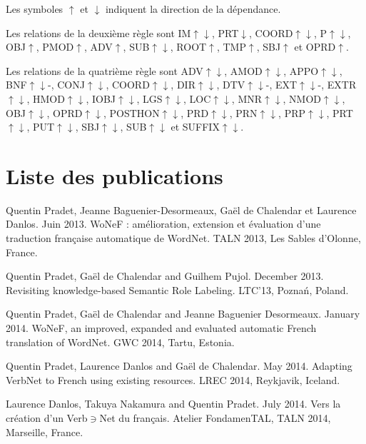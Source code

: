 \documentclass[oneside,parskip,draft]{scrbook}
\begin{document}
Les symboles $\uparrow$ et $\downarrow$ indiquent la direction de la
dépendance.

Les relations de la deuxième règle sont IM$\uparrow\downarrow$,
PRT$\downarrow$, COORD$\uparrow\downarrow$, P$\uparrow\downarrow$,
OBJ$\uparrow$, PMOD$\uparrow$, ADV$\uparrow$, SUB$\uparrow\downarrow$,
ROOT$\uparrow$, TMP$\uparrow$, SBJ$\uparrow$ et OPRD$\uparrow$.

Les relations de la quatrième règle sont ADV$\uparrow\downarrow$,
AMOD$\uparrow\downarrow$, APPO$\uparrow\downarrow$, BNF$\uparrow\downarrow$-,
CONJ$\uparrow\downarrow$, COORD$\uparrow\downarrow$, DIR$\uparrow\downarrow$,
DTV$\uparrow\downarrow$-, EXT$\uparrow\downarrow$-, EXTR$\uparrow\downarrow$,
HMOD$\uparrow\downarrow$, IOBJ$\uparrow\downarrow$, LGS$\uparrow\downarrow$,
LOC$\uparrow\downarrow$, MNR$\uparrow\downarrow$, NMOD$\uparrow\downarrow$,
OBJ$\uparrow\downarrow$, OPRD$\uparrow\downarrow$, POSTHON$\uparrow\downarrow$,
PRD$\uparrow\downarrow$, PRN$\uparrow\downarrow$, PRP$\uparrow\downarrow$,
PRT$\uparrow\downarrow$, PUT$\uparrow\downarrow$, SBJ$\uparrow\downarrow$,
SUB$\uparrow\downarrow$ et SUFFIX$\uparrow\downarrow$.

\chapter{Liste des publications}

Quentin Pradet, Jeanne Baguenier-Desormeaux, Gaël de Chalendar et Laurence Danlos. Juin 2013. WoNeF : amélioration, extension et évaluation d’une traduction française automatique de WordNet. TALN 2013, Les Sables d'Olonne, France.

Quentin Pradet, Gaël de Chalendar and Guilhem Pujol. December 2013. Revisiting knowledge-based Semantic Role Labeling. LTC'13, Poznań, Poland.

Quentin Pradet, Gaël de Chalendar and Jeanne Baguenier Desormeaux. January 2014. WoNeF, an improved, expanded and evaluated automatic French translation of WordNet. GWC 2014, Tartu, Estonia.

Quentin Pradet, Laurence Danlos and Gaël de Chalendar. May 2014. Adapting VerbNet to French using existing resources. LREC 2014, Reykjavik, Iceland.

Laurence Danlos, Takuya Nakamura and Quentin Pradet. July 2014. Vers la création d’un Verb$\ni$Net du français. Atelier FondamenTAL, TALN 2014, Marseille, France.


\end{document}
